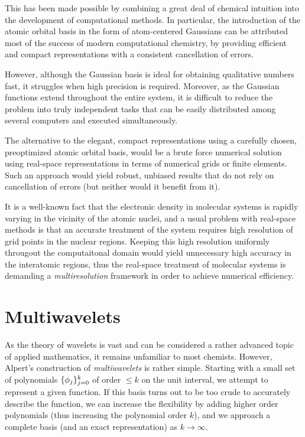 This has been made possible by combining a great deal of chemical intuition into the 
development of computational methods. In particular, the introduction of the atomic 
orbital basis in the form of atom-centered Gaussians can be attributed most of the 
success of modern computational chemistry, by providing efficient and compact 
representations with a consistent cancellation of errors. 

However, although the Gaussian basis is ideal for obtaining qualitative numbers fast, 
it struggles when high precision is required. Moreover, as the Gaussian functions 
extend throughout the entire system, it is difficult to reduce the problem into truly 
independent tasks that can be easily distributed among several computers and executed 
simultaneously.

The alternative to the elegant, compact representations using a carefully chosen, 
preoptimized atomic orbital basis, would be a brute force numerical solution using 
real-space representations in terms of numerical grids or finite elements. Such an 
approach would yield robust, unbiased results that do not rely on cancellation of 
errors (but neither would it benefit from it).

It is a well-known fact that the electronic density in molecular systems is rapidly 
varying in the vicinity of the atomic nuclei, and a usual problem with real-space 
methods is that an accurate treatment of the system requires high resolution of grid 
points in the nuclear regions. Keeping this high resolution uniformly througout the 
computaitonal domain would yield unnecessary high accuracy in the interatomic regions, 
thus the real-space treatment of molecular systems is demanding a \emph{multiresolution} 
framework in order to achieve numerical efficiency.

\section{Multiwavelets}
As the theory of wavelets is vast and can be considered a rather advanced topic
of applied mathematics, it remains unfamiliar to most chemists. However, 
Alpert's\cite{Alpert:1993p5460} construction of \emph{multiwavelets} is rather 
simple. Starting with a small set of polynomials $\lbrace\phi_j\rbrace_{j=0}^k$ 
of order $\leq k$ on the unit interval, we attempt to represent a given function. 
If this basis turns out to be too crude to accurately describe the function, we 
can increase the flexibility by adding higher order polynomials (thus increasing 
the polynomial order $k$), and we approach a complete basis (and an exact 
representation) as $k\rightarrow\infty$.

